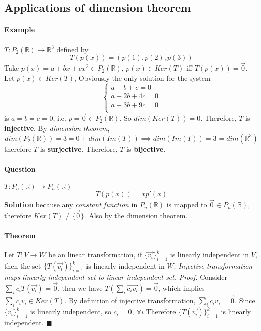 \documentclass[11pt]{article}
\newcommand{\R}[0]{\mathbb{R}}
\begin{document}
 	\subsection{Applications of dimension theorem}
 	\paragraph{Example} $T: P_2(\mathbb{R}) \to \mathbb{R}^3$ defined by 
 	\[
 		T(p(x)) = (p(1), p(2), p(3))
 	\]
 	Take $p(x) = a + bx + cx^2 \in P_2(\mathbb{R})$, $p(x) \in Ker(T)$ iff $T(p(x)) = \vec{0}$.
 	\newline Let $p(x) \in Ker(T)$,
 	\newline Obviously the only solution for the system
 	\[
 		\begin{cases}
 			a + b + c = 0\\
 			a + 2b + 4c = 0\\
 			a + 3b + 9c = 0\\
 		\end{cases}
 	\]  is $a=b=c=0$, i.e. $p = \vec{0} \in P_2(\R)$. So $dim(Ker(T)) = 0$. Therefore, $T$ is \textbf{injective}.
 	\newline By \emph{dimension theorem},
 	\[dim(P_2(\R)) = 3 = 0 + dim(Im(T)) \implies dim(Im(T)) =  3 = dim(\mathbb{R}^3)\]
 	therefore $T$ is \textbf{surjective}. Therefore, $T$ is \textbf{bijective}.
 	
 	\paragraph{Question} $T: P_n(\mathbb{R}) \to P_n(\mathbb{R})$
 	\[
 		T(p(x)) = x p'(x)
 	\]
 	\quad \textbf{Solution}  because any \emph{constant function} in $P_n(\mathbb{R})$ is mapped to $\vec{0} \in P_n(\mathbb{R})$, therefore $Ker(T) \neq \{\vec{0}\}$. Also  by the dimension theorem.
 	
 	\paragraph{Theorem} Let $T: V \to W$ be an  linear transformation, if 
 	$\{\vec{v_i}\}_{i=1}^k$ is linearly independent in $V$, then the set $\{T(\vec{v_i})\}_{i=1}^k$ is linearly independent in $W$. \emph{Injective transformation maps linearly independent set to linear independent set.}
 	\newline \quad
 	\newline \emph{Proof.}
 	Consider $\sum_{i}{c_iT(\vec{v_i})} = \vec{0}$, then we have $T(\sum_{i}{\vec{c_i v_i}}) = \vec{0}$, which implies $\sum_{i}{c_i v_i} \in Ker(T)$. By definition of injective transformation, $\sum_{i}{c_i v_i} = \vec{0}$. Since $\{\vec{v_i}\}_{i=1}^k$ is linearly independent, so $c_i = 0,\ \forall i$ Therefore $\{T(\vec{v_i})\}_{i=1}^k$ is linearly independent. \hfill $\blacksquare$
 	
\end{document}
